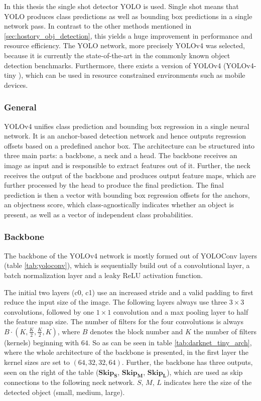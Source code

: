 \label{sec:yolo}

In this thesis the single shot detector \ac{YOLO} \cite{yolov1} is used.
Single shot means that \ac{YOLO} produces class predictions as well as bounding box predictions in a single network pass.
In contrast to the other methods mentioned in \ref{sec:hostory_obj_detection}, this yields a huge improvement in performance and resource efficiency.
The \ac{YOLO} network, more precisely \ac{YOLOv4} \cite{yolov4} was selected, because it is currently the state-of-the-art in the commonly known object detection benchmarks.
Furthermore, there exists a version of \ac{YOLOv4} (YOLOv4-tiny \cite{yolov4_tiny}), which can be used in resource constrained environments such as mobile devices.

\subsubsection{General}

\ac{YOLOv4} unifies class prediction and bounding box regression in a single neural network.
It is an anchor-based detection network and hence outputs regression offsets based on a predefined anchor box.
The architecture can be structured into three main parts: a backbone, a neck and a head.
The backbone receives an image as input and is responsible to extract features out of it.
Further, the neck receives the output of the backbone and produces output feature maps, which are further processed by the head to produce the final prediction.
The final prediction is then a vector with bounding box regression offsets for the anchors, an objectness score, which class-agnostically indicates whether an object is present, as well as a vector of independent class probabilities.

\subsubsection{Backbone}

The backbone of the \ac{YOLOv4} network is mostly formed out of YOLOConv layers (table \ref{tab:yoloconv}), which is sequentially build out of a convolutional layer, a batch normalization layer and a leaky \ac{ReLU} activation function.

The initial two layers (c0, c1) use an increased stride and a valid padding to first reduce the input size of the image.
The following layers always use three $3 \times 3$ convolutions, followed by one $1 \times 1$ convolution and a max pooling layer to half the feature map size.
The number of filters for the four convolutions is always $B \cdot (K, \frac{K}{2}, \frac{K}{2}, K)$, where $B$ denotes the block number and $K$ the number of filters (kernels) beginning with $64$.
So as can be seen in table \ref{tab:darknet_tiny_arch}, where the whole architecture of the backbone is presented, in the first layer the kernel sizes are set to $(64, 32, 32, 64)$.
Further, the backbone has three outputs, seen on the right of the table ($\mathbf{Skip_S}$, $\mathbf{Skip_M}$, $\mathbf{Skip_L}$), which are used as skip connections to the following neck network.
$S$, $M$, $L$ indicates here the size of the detected object (small, medium, large).

